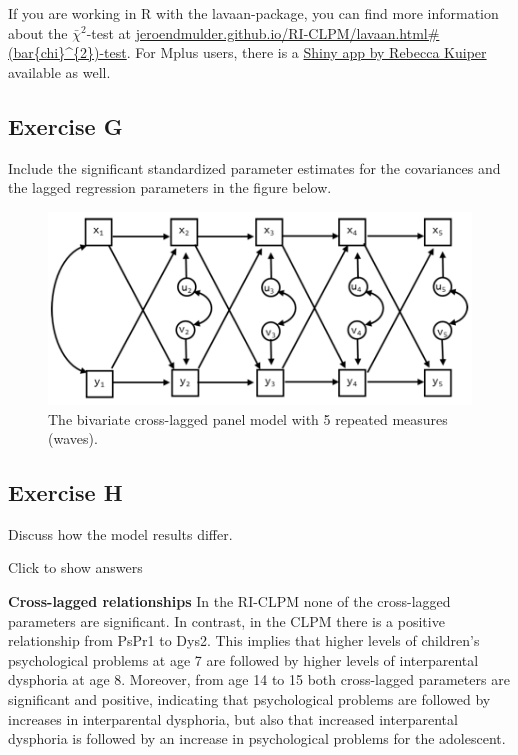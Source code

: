 \documentclass[
]{book}
\begin{document}
If you are working in R with the lavaan-package, you can find more information about the \(\bar{\chi}^{2}\)-test at \href{https://jeroendmulder.github.io/RI-CLPM/lavaan.html\#(bar\%7Bchi\%7D\%5E\%7B2\%7D)-test}{jeroendmulder.github.io/RI-CLPM/lavaan.html\#(bar\{chi\}\^{}\{2\})-test}. For Mplus users, there is a \href{https://www.uu.nl/staff/RMKuiper/Websites\%20\%2F\%20Shiny\%20apps}{Shiny app by Rebecca Kuiper} available as well.

\hypertarget{exercise-g-1}{%
\subsection{Exercise G}\label{exercise-g-1}}

Include the significant standardized parameter estimates for the covariances and the lagged regression parameters in the figure below.

\begin{figure}
\centering
\includegraphics[width=5.20833in,height=\textheight]{CLPM-5waves.png}
\caption{The bivariate cross-lagged panel model with 5 repeated measures (waves).}
\end{figure}

\hypertarget{exercise-h-1}{%
\subsection{Exercise H}\label{exercise-h-1}}

Discuss how the model results differ.

Click to show answers

\textbf{Cross-lagged relationships}
In the RI-CLPM none of the cross-lagged parameters are significant. In contrast, in the CLPM there is a positive relationship from PsPr1 to Dys2. This implies that higher levels of children's psychological problems at age 7 are followed by higher levels of interparental dysphoria at age 8. Moreover, from age 14 to 15 both cross-lagged parameters are significant and positive, indicating that psychological problems are followed by increases in interparental dysphoria, but also that increased interparental dysphoria is followed by an increase in psychological problems for the adolescent.
\end{document}
